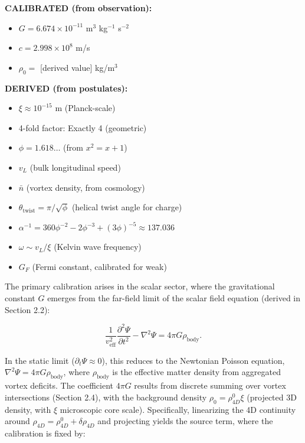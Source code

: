 \begin{tcolorbox}[title=Parameter Values]
\textbf{CALIBRATED (from observation):}
\begin{itemize}
\item $G = 6.674 \times 10^{-11}$ m$^3$ kg$^{-1}$ s$^{-2}$
\item $c = 2.998 \times 10^8$ m/s
\item $\rho_0 = $ [derived value] kg/m$^3$
\end{itemize}

\textbf{DERIVED (from postulates):}
\begin{itemize}
\item $\xi \approx 10^{-15}$ m (Planck-scale)
\item 4-fold factor: Exactly 4 (geometric)
\item $\phi = 1.618\dots$ (from $x^2 = x + 1$)
\item $v_L$ (bulk longitudinal speed)
\item $\bar{n}$ (vortex density, from cosmology)
\item $\theta_{\text{twist}} = \pi / \sqrt{\phi}$ (helical twist angle for charge)
\item $\alpha^{-1} = 360 \phi^{-2} - 2 \phi^{-3} + (3 \phi)^{-5} \approx 137.036$
\item $\omega \sim v_L / \xi$ (Kelvin wave frequency)
\item $G_F$ (Fermi constant, calibrated for weak)
\end{itemize}
\end{tcolorbox}

The primary calibration arises in the scalar sector, where the gravitational constant $G$ emerges from the far-field limit of the scalar field equation (derived in Section 2.2):

\[
\frac{1}{v_{\text{eff}}^2} \frac{\partial^2 \Psi}{\partial t^2} - \nabla^2 \Psi = 4\pi G \rho_{\text{body}}.
\]

In the static limit ($\partial_t \Psi \approx 0$), this reduces to the Newtonian Poisson equation, $\nabla^2 \Psi = 4\pi G \rho_{\text{body}}$, where $\rho_{\text{body}}$ is the effective matter density from aggregated vortex deficits. The coefficient $4\pi G$ results from discrete summing over vortex intersections (Section 2.4), with the background density $\rho_0 = \rho_{4D}^0 \xi$ (projected 3D density, with $\xi$ microscopic core scale). Specifically, linearizing the 4D continuity around $\rho_{4D} = \rho_{4D}^0 + \delta \rho_{4D}$ and projecting yields the source term, where the calibration is fixed by:

